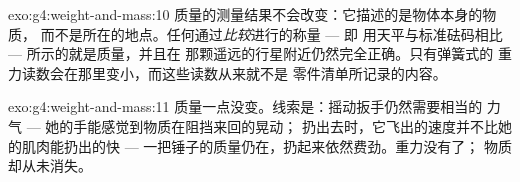 \begin{solution}{exo:g4:weight-and-mass:10}
质量的测量结果不会改变：它描述的是物体本身的物质，
而不是所在的地点。任何通过\emph{比较}进行的称量 --- 即
用天平与标准砝码相比 --- 所示的就是质量，并且在
那颗遥远的行星附近仍然完全正确。只有弹簧式的
重力读数会在那里变小，而这些读数从来就不是
零件清单所记录的内容。
\end{solution}

\begin{solution}{exo:g4:weight-and-mass:11}
质量一点没变。线索是：摇动扳手仍然需要相当的
力气 --- 她的手能感觉到物质在阻挡来回的晃动；
扔出去时，它飞出的速度并不比她的肌肉能扔出的快 ---
一把锤子的质量仍在，扔起来依然费劲。重力没有了；
物质却从未消失。
\end{solution}
